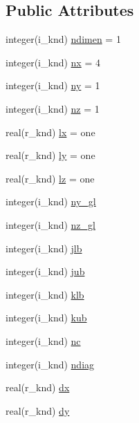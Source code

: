 \subsection*{Public Attributes}
\begin{DoxyCompactItemize}
\item 
integer(i\-\_\-knd) \hyperlink{classgeom__module_a764bf4ab4dc187512c803d73505e6b57}{ndimen} = 1
\item 
integer(i\-\_\-knd) \hyperlink{classgeom__module_a7a5902416f1d33e2a27620d6c82db061}{nx} = 4
\item 
integer(i\-\_\-knd) \hyperlink{classgeom__module_a38b87580d41ec11b8719f65f06b8b0a3}{ny} = 1
\item 
integer(i\-\_\-knd) \hyperlink{classgeom__module_a5f461a2f10c78de302a44c8c70b8fca5}{nz} = 1
\item 
real(r\-\_\-knd) \hyperlink{classgeom__module_a1fe9e4dc8297fc98198b561000a97973}{lx} = one
\item 
real(r\-\_\-knd) \hyperlink{classgeom__module_adc5d5005b562bb94578c33b5bcde0012}{ly} = one
\item 
real(r\-\_\-knd) \hyperlink{classgeom__module_aba080d6dd2b57ad40676a7331daaa824}{lz} = one
\item 
integer(i\-\_\-knd) \hyperlink{classgeom__module_a28abec0d4fe709bc64ee36b68347ce1a}{ny\-\_\-gl}
\item 
integer(i\-\_\-knd) \hyperlink{classgeom__module_a3d237cf21a21064504566ce34b27c848}{nz\-\_\-gl}
\item 
integer(i\-\_\-knd) \hyperlink{classgeom__module_a87c8f8859d2d98c1dfc36f0ccf4208df}{jlb}
\item 
integer(i\-\_\-knd) \hyperlink{classgeom__module_ada7a9e753e21b30a06f0858f5deb4300}{jub}
\item 
integer(i\-\_\-knd) \hyperlink{classgeom__module_a7c3abb8b57ed30570288a1da71db8444}{klb}
\item 
integer(i\-\_\-knd) \hyperlink{classgeom__module_a79842b1abc678e999d926bc361620371}{kub}
\item 
integer(i\-\_\-knd) \hyperlink{classgeom__module_af92dc09eacd9c240bd51ea2792a13820}{nc}
\item 
integer(i\-\_\-knd) \hyperlink{classgeom__module_af0fed67c5ea2d50ee5063a4c83f43f00}{ndiag}
\item 
real(r\-\_\-knd) \hyperlink{classgeom__module_a2f292c19b0e9bfc4cde1d54f0e9d4472}{dx}
\item 
real(r\-\_\-knd) \hyperlink{classgeom__module_a13234163c83c1041d8053ab0f4ea5d40}{dy}

\end{DoxyCompactItemize}
